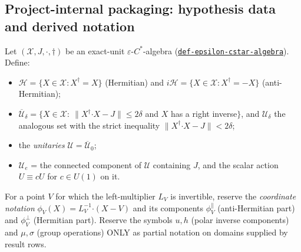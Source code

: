 
\subsection*{Project-internal packaging: hypothesis data and derived notation}

\hypertarget{def:approximate-unitary-space}{}%
\begin{definition}\label{def:approximate-unitary-space}
Let
$(\mathcal X,J,\boldsymbol\cdot,\dagger)$ be an exact-unit
$\varepsilon$-$C^*$-algebra (\hyperref[def:epsilon-cstar-algebra]{\texttt{def-\allowbreak{}epsilon-\allowbreak{}cstar-\allowbreak{}algebra}}). Define:

\begin{itemize}
\item $\mathcal H=\{X\in\mathcal X: X^\dagger=X\}$ (Hermitian) and
$i\mathcal H=\{X\in\mathcal X: X^\dagger=-X\}$ (anti-Hermitian);
\item $\overline{\mathcal U}_\delta=\{X\in\mathcal X:\ \lVert X^\dagger\boldsymbol\cdot X-J\rVert\le 2\delta$
and $X$ has a right inverse$\}$, and $\mathcal U_\delta$ the analogous set
with the strict inequality $\lVert X^\dagger\boldsymbol\cdot X-J\rVert<2\delta$;
\item the \emph{unitaries} $\mathcal U=\overline{\mathcal U}_0$;
\item $\mathcal U_e$ = the connected component of $\mathcal U$ containing $J$,
and the scalar action $U\equiv cU$ for $c\in U(1)$ on it.
\end{itemize}

For a point $V$ for which the left-multiplier $L_V$ is invertible, reserve
the \emph{coordinate notation} $\phi_V(X)=L_V^{-1}\boldsymbol\cdot(X-V)$ and its
components $\phi_V^{\parallel}$ (anti-Hermitian part) and $\phi_V^{\perp}$
(Hermitian part). Reserve the symbols $u,h$ (polar inverse components) and
$\mu,\sigma$ (group operations) ONLY as partial notation on domains supplied
by result rows.
\end{definition}
